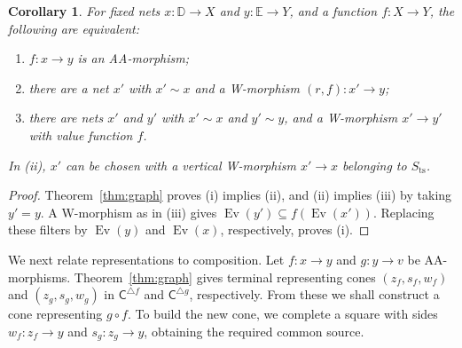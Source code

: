 \documentclass[11pt,a4paper]{article}
\newtheorem{corollary}[theorem]{Corollary}
\theoremstyle{definition}
\theoremstyle{remark}
\newcommand{\CC}{\mathsf C}
\newcommand{\Ev}{\operatorname{Ev}}
\newcommand{\Sts}{S_{\mathrm{ts}}}
\begin{document}
\begin{samepage}
\begin{corollary}\label{cor:replacement}
For fixed nets \(x:\mathbb D\to X\) and \(y:\mathbb E\to Y\), and a
function \(f:X\to Y\), the following are equivalent:
\begin{enumerate}[label=(\roman*)]
\item \(f:x\to y\) is an AA-morphism;
\item there are a net \(x'\) with \(x'\sim x\) and a W-morphism
\((r,f):x'\to y\);
\item there are nets \(x'\) and \(y'\) with \(x'\sim x\) and
\(y'\sim y\), and a W-morphism \(x'\to y'\) with value function \(f\).
\end{enumerate}
In (ii), \(x'\) can be chosen with a vertical W-morphism
\(x'\to x\) belonging to \(\Sts\).
\end{corollary}
\end{samepage}
\begin{proof}
Theorem~\ref{thm:graph} proves (i) implies (ii), and (ii) implies
(iii) by taking \(y'=y\). A W-morphism as in (iii) gives
\(\Ev(y')\subseteq f(\Ev(x'))\). Replacing these filters by
\(\Ev(y)\) and \(\Ev(x)\), respectively, proves (i).
\end{proof}

We next relate representations to composition. Let \(f:x\to y\) and
\(g:y\to v\) be AA-morphisms. Theorem~\ref{thm:graph} gives terminal
representing cones \((z_f,s_f,w_f)\) and \((z_g,s_g,w_g)\) in
\(\CC^{\triangle f}\) and \(\CC^{\triangle g}\), respectively.
From these we shall construct a cone representing \(g\circ f\).
To build the new cone, we complete a square with sides \(w_f:z_f\to y\)
and \(s_g:z_g\to y\), obtaining the required common source.
\end{document}
